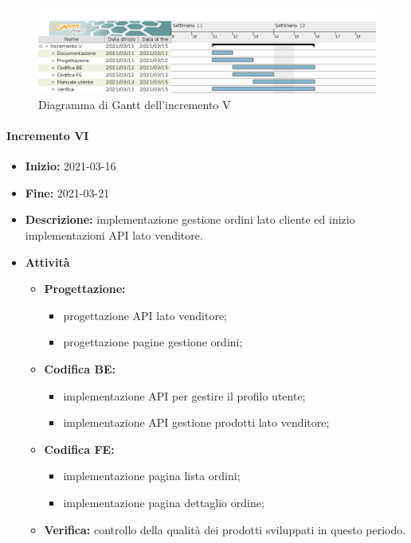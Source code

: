 \begin{figure}[H]
    \centering
    \includegraphics[width=1\linewidth]{res/images/pianificazione/incremento_5.png}
    \caption{Diagramma di Gantt dell'incremento V}
    \label{fig:_Gantt incremento V}
\end{figure}

\paragraph[Incremento VI]{Incremento VI}
\begin{itemize}
    \item [] \textbf{Inizio:} 2021-03-16
    \item [] \textbf{Fine:} 2021-03-21
    \item [] \textbf{Descrizione:} implementazione gestione ordini lato cliente ed inizio implementazioni API lato venditore.
    \item [] \textbf{Attività}
          \begin{itemize}
              \item \textbf{Progettazione:}
                    \begin{itemize}
                        \item progettazione API lato venditore;
                        \item progettazione pagine gestione ordini;
                    \end{itemize}
              \item \textbf{Codifica BE:}
                    \begin{itemize}
                        \item implementazione API per gestire il profilo utente;
                        \item implementazione API gestione prodotti lato venditore;
                    \end{itemize}
              \item \textbf{Codifica FE:}
                    \begin{itemize}
                        \item implementazione pagina lista ordini;
                        \item implementazione pagina dettaglio ordine;
                    \end{itemize}
              \item \textbf{Verifica:} controllo della qualità dei prodotti sviluppati in questo periodo.
          \end{itemize}
\end{itemize}

